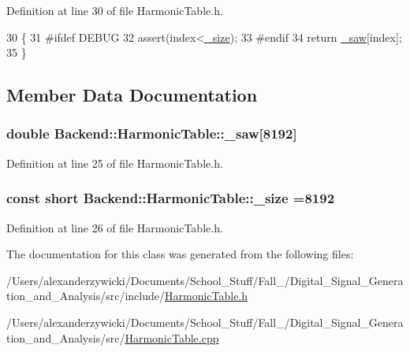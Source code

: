 Definition at line 30 of file Harmonic\+Table.\+h.


\begin{DoxyCode}
30                                                                   \{
31 \textcolor{preprocessor}{#ifdef DEBUG}
32     assert(index<\hyperlink{class_backend_1_1_harmonic_table_a94c9f17b8fd4b514d145fbb8b0ed63dd}{\_size});
33 \textcolor{preprocessor}{#endif}
34     \textcolor{keywordflow}{return} \hyperlink{class_backend_1_1_harmonic_table_a464db802494a562d2c9d0840ee6d1483}{\_saw}[index];
35 \}
\end{DoxyCode}


\subsection{Member Data Documentation}
\hypertarget{class_backend_1_1_harmonic_table_a464db802494a562d2c9d0840ee6d1483}{
\subsubsection[{\+\_\+saw}]{\setlength{\rightskip}{0pt plus 5cm}double Backend\+::\+Harmonic\+Table\+::\+\_\+saw\mbox{[}8192\mbox{]}\hspace{0.3cm}{\ttfamily [protected]}}}\label{class_backend_1_1_harmonic_table_a464db802494a562d2c9d0840ee6d1483}


Definition at line 25 of file Harmonic\+Table.\+h.

\hypertarget{class_backend_1_1_harmonic_table_a94c9f17b8fd4b514d145fbb8b0ed63dd}{
\subsubsection[{\+\_\+size}]{\setlength{\rightskip}{0pt plus 5cm}const short Backend\+::\+Harmonic\+Table\+::\+\_\+size =8192\hspace{0.3cm}{\ttfamily [protected]}}}\label{class_backend_1_1_harmonic_table_a94c9f17b8fd4b514d145fbb8b0ed63dd}


Definition at line 26 of file Harmonic\+Table.\+h.



The documentation for this class was generated from the following files\+:\begin{DoxyCompactItemize}
\item 
/\+Users/alexanderzywicki/\+Documents/\+School\+\_\+\+Stuff/\+Fall\+\_/\+Digital\+\_\+\+Signal\+\_\+\+Generation\+\_\+and\+\_\+\+Analysis/src/include/\hyperlink{_harmonic_table_8h}{Harmonic\+Table.\+h}\item 
/\+Users/alexanderzywicki/\+Documents/\+School\+\_\+\+Stuff/\+Fall\+\_/\+Digital\+\_\+\+Signal\+\_\+\+Generation\+\_\+and\+\_\+\+Analysis/src/\hyperlink{_harmonic_table_8cpp}{Harmonic\+Table.\+cpp}\end{DoxyCompactItemize}
